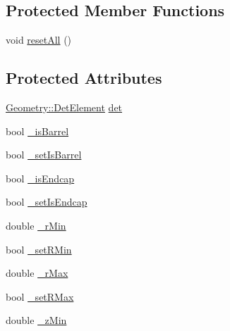 \subsection*{Protected Member Functions}
\begin{DoxyCompactItemize}
\item 
void \hyperlink{class_d_d4hep_1_1_d_d_rec_1_1_subdetector_extension_impl_aadfe7c78e6a5d977d9d2f9d6a6222618}{reset\+All} ()
\end{DoxyCompactItemize}
\subsection*{Protected Attributes}
\begin{DoxyCompactItemize}
\item 
\hyperlink{class_d_d4hep_1_1_geometry_1_1_det_element}{Geometry\+::\+Det\+Element} \hyperlink{class_d_d4hep_1_1_d_d_rec_1_1_subdetector_extension_impl_a5573895361adac8070eb23454538d76e}{det}
\item 
bool \hyperlink{class_d_d4hep_1_1_d_d_rec_1_1_subdetector_extension_impl_aca8d64e7e01c75f25020bcb13b68ba76}{\+\_\+is\+Barrel}
\item 
bool \hyperlink{class_d_d4hep_1_1_d_d_rec_1_1_subdetector_extension_impl_a5044a5f0bffb6967aa75c1486d7e0403}{\+\_\+set\+Is\+Barrel}
\item 
bool \hyperlink{class_d_d4hep_1_1_d_d_rec_1_1_subdetector_extension_impl_ab4ac574b15b70218b3c101314002d390}{\+\_\+is\+Endcap}
\item 
bool \hyperlink{class_d_d4hep_1_1_d_d_rec_1_1_subdetector_extension_impl_ab96ac61e873d487a1837b4abe156869e}{\+\_\+set\+Is\+Endcap}
\item 
double \hyperlink{class_d_d4hep_1_1_d_d_rec_1_1_subdetector_extension_impl_a01b803bfceeeff565ed7728e6292ecb6}{\+\_\+r\+Min}
\item 
bool \hyperlink{class_d_d4hep_1_1_d_d_rec_1_1_subdetector_extension_impl_aa2540f465262ee20af21a1dae2a33f12}{\+\_\+set\+R\+Min}
\item 
double \hyperlink{class_d_d4hep_1_1_d_d_rec_1_1_subdetector_extension_impl_ac9a17365ea087ce3a3b9dbec6b514f14}{\+\_\+r\+Max}
\item 
bool \hyperlink{class_d_d4hep_1_1_d_d_rec_1_1_subdetector_extension_impl_a8a23eb897b7a367cd183adddf88e8fe7}{\+\_\+set\+R\+Max}
\item 
double \hyperlink{class_d_d4hep_1_1_d_d_rec_1_1_subdetector_extension_impl_a33f8e745fb1bf3a861f69c1f3585c8b9}{\+\_\+z\+Min}
\item 

\end{DoxyCompactItemize}
